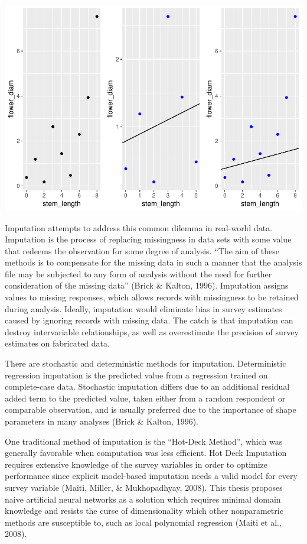 \documentclass[12pt,twoside]{reedthesis}
\begin{document}
\includegraphics[width=0.9\linewidth]{thesis_files/figure-latex/systematic-1}

Imputation attempts to address this common dilemma in real-world data.
Imputation is the process of replacing missingness in data sets with
some value that redeems the observation for some degree of analysis.
``The aim of these methods is to compensate for the missing data in such
a manner that the analysis file may be subjected to any form of analysis
without the need for further consideration of the missing data'' (Brick
\& Kalton, 1996). Imputation assigns values to missing responses, which
allows records with missingness to be retained during analysis. Ideally,
imputation would eliminate bias in survey estimates caused by ignoring
records with missing data. The catch is that imputation can destroy
intervariable relationships, as well as overestimate the precision of
survey estimates on fabricated data.

There are stochastic and deterministic methods for imputation.
Deterministic regression imputation is the predicted value from a
regression trained on complete-case data. Stochastic imputation differs
due to an additional residual added term to the predicted value, taken
either from a random respondent or comparable observation, and is
usually preferred due to the importance of shape parameters in many
analyses (Brick \& Kalton, 1996).

One traditional method of imputation is the ``Hot-Deck Method'', which
was generally favorable when computation was less efficient. Hot Deck
Imputation requires extensive knowledge of the survey variables in order
to optimize performance since explicit model-based imputation needs a
valid model for every survey variable (Maiti, Miller, \& Mukhopadhyay,
2008). This thesis proposes naive artificial neural networks as a
solution which requires minimal domain knowledge and resists the curse
of dimensionality which other nonparametric methods are susceptible to,
such as local polynomial regression (Maiti et al., 2008).
\end{document}
